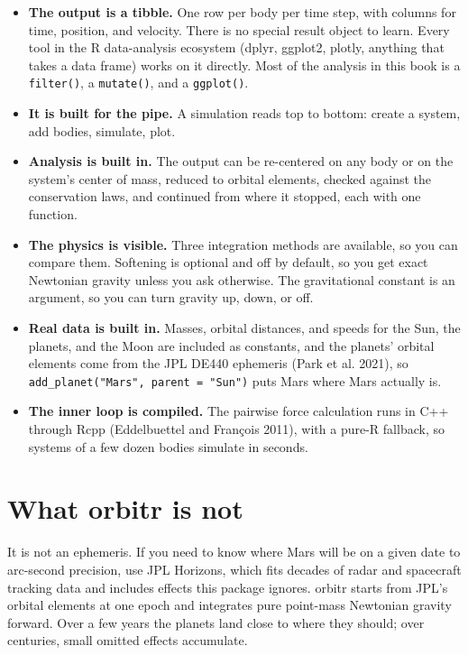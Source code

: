 \documentclass[
  10.5pt,
  letterpaper,
]{scrbook}
\providecommand{\tightlist}{%
  \setlength{\itemsep}{0pt}\setlength{\parskip}{0pt}}
\theoremstyle{plain}
\theoremstyle{remark}
\begin{document}
\begin{itemize}
\tightlist
\item
  \textbf{The output is a tibble.} One row per body per time step, with
  columns for time, position, and velocity. There is no special result
  object to learn. Every tool in the R data-analysis ecosystem (dplyr,
  ggplot2, plotly, anything that takes a data frame) works on it
  directly. Most of the analysis in this book is a \texttt{filter()}, a
  \texttt{mutate()}, and a \texttt{ggplot()}.
\item
  \textbf{It is built for the pipe.} A simulation reads top to bottom:
  create a system, add bodies, simulate, plot.
\item
  \textbf{Analysis is built in.} The output can be re-centered on any
  body or on the system's center of mass, reduced to orbital elements,
  checked against the conservation laws, and continued from where it
  stopped, each with one function.
\item
  \textbf{The physics is visible.} Three integration methods are
  available, so you can compare them. Softening is optional and off by
  default, so you get exact Newtonian gravity unless you ask otherwise.
  The gravitational constant is an argument, so you can turn gravity up,
  down, or off.
\item
  \textbf{Real data is built in.} Masses, orbital distances, and speeds
  for the Sun, the planets, and the Moon are included as constants, and
  the planets' orbital elements come from the JPL DE440 ephemeris (Park
  et al. 2021), so \texttt{add\_planet("Mars",\ parent\ =\ "Sun")} puts
  Mars where Mars actually is.
\item
  \textbf{The inner loop is compiled.} The pairwise force calculation
  runs in C++ through Rcpp (Eddelbuettel and François 2011), with a
  pure-R fallback, so systems of a few dozen bodies simulate in seconds.
\end{itemize}

\section{What orbitr is not}\label{what-orbitr-is-not}

It is not an ephemeris. If you need to know where Mars will be on a
given date to arc-second precision, use JPL Horizons, which fits decades
of radar and spacecraft tracking data and includes effects this package
ignores. orbitr starts from JPL's orbital elements at one epoch and
integrates pure point-mass Newtonian gravity forward. Over a few years
the planets land close to where they should; over centuries, small
omitted effects accumulate.
\end{document}
